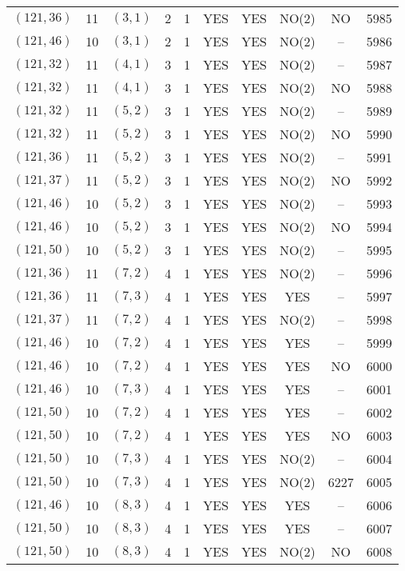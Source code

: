 \begin{longtable}{|c|c|c|c|c|c|c|c|c|c|}
$(121, 36)$ & 11 & $(3, 1)$ & 2 & 1 & YES & YES & NO(2) & NO & 5985\\
$(121, 46)$ & 10 & $(3, 1)$ & 2 & 1 & YES & YES & NO(2) & -- & 5986\\
$(121, 32)$ & 11 & $(4, 1)$ & 3 & 1 & YES & YES & NO(2) & -- & 5987\\
$(121, 32)$ & 11 & $(4, 1)$ & 3 & 1 & YES & YES & NO(2) & NO & 5988\\
$(121, 32)$ & 11 & $(5, 2)$ & 3 & 1 & YES & YES & NO(2) & -- & 5989\\
$(121, 32)$ & 11 & $(5, 2)$ & 3 & 1 & YES & YES & NO(2) & NO & 5990\\
$(121, 36)$ & 11 & $(5, 2)$ & 3 & 1 & YES & YES & NO(2) & -- & 5991\\
$(121, 37)$ & 11 & $(5, 2)$ & 3 & 1 & YES & YES & NO(2) & NO & 5992\\
$(121, 46)$ & 10 & $(5, 2)$ & 3 & 1 & YES & YES & NO(2) & -- & 5993\\
$(121, 46)$ & 10 & $(5, 2)$ & 3 & 1 & YES & YES & NO(2) & NO & 5994\\
$(121, 50)$ & 10 & $(5, 2)$ & 3 & 1 & YES & YES & NO(2) & -- & 5995\\
$(121, 36)$ & 11 & $(7, 2)$ & 4 & 1 & YES & YES & NO(2) & -- & 5996\\
$(121, 36)$ & 11 & $(7, 3)$ & 4 & 1 & YES & YES & YES & -- & 5997\\
$(121, 37)$ & 11 & $(7, 2)$ & 4 & 1 & YES & YES & NO(2) & -- & 5998\\
$(121, 46)$ & 10 & $(7, 2)$ & 4 & 1 & YES & YES & YES & -- & 5999\\
$(121, 46)$ & 10 & $(7, 2)$ & 4 & 1 & YES & YES & YES & NO & 6000\\
$(121, 46)$ & 10 & $(7, 3)$ & 4 & 1 & YES & YES & YES & -- & 6001\\
$(121, 50)$ & 10 & $(7, 2)$ & 4 & 1 & YES & YES & YES & -- & 6002\\
$(121, 50)$ & 10 & $(7, 2)$ & 4 & 1 & YES & YES & YES & NO & 6003\\
$(121, 50)$ & 10 & $(7, 3)$ & 4 & 1 & YES & YES & NO(2) & -- & 6004\\
$(121, 50)$ & 10 & $(7, 3)$ & 4 & 1 & YES & YES & NO(2) & 6227 & 6005\\
$(121, 46)$ & 10 & $(8, 3)$ & 4 & 1 & YES & YES & YES & -- & 6006\\
$(121, 50)$ & 10 & $(8, 3)$ & 4 & 1 & YES & YES & YES & -- & 6007\\
$(121, 50)$ & 10 & $(8, 3)$ & 4 & 1 & YES & YES & NO(2) & NO & 6008\\

\end{longtable}

